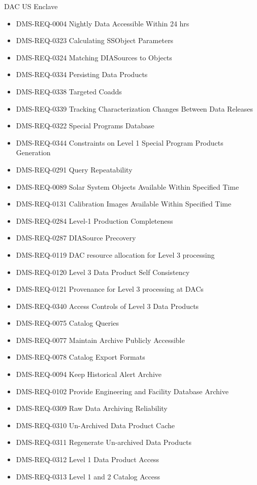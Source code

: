 DAC US Enclave \begin{itemize}
\item DMS-REQ-0004 Nightly Data Accessible Within 24 hrs
\item DMS-REQ-0323 Calculating SSObject Parameters
\item DMS-REQ-0324 Matching DIASources to Objects
\item DMS-REQ-0334 Persisting Data Products
\item DMS-REQ-0338 Targeted Coadds
\item DMS-REQ-0339 Tracking Characterization Changes Between Data Releases
\item DMS-REQ-0322 Special Programs Database
\item DMS-REQ-0344 Constraints on Level 1 Special Program Products Generation
\item DMS-REQ-0291 Query Repeatability
\item DMS-REQ-0089 Solar System Objects Available Within Specified Time
\item DMS-REQ-0131 Calibration Images Available Within Specified Time
\item DMS-REQ-0284 Level-1 Production Completeness
\item DMS-REQ-0287 DIASource Precovery
\item DMS-REQ-0119 DAC resource allocation for Level 3 processing
\item DMS-REQ-0120 Level 3 Data Product Self Consistency
\item DMS-REQ-0121 Provenance for Level 3 processing at DACs
\item DMS-REQ-0340 Access Controls of Level 3 Data Products
\item DMS-REQ-0075 Catalog Queries
\item DMS-REQ-0077 Maintain Archive Publicly Accessible
\item DMS-REQ-0078 Catalog Export Formats
\item DMS-REQ-0094 Keep Historical Alert Archive
\item DMS-REQ-0102 Provide Engineering and Facility Database Archive
\item DMS-REQ-0309 Raw Data Archiving Reliability
\item DMS-REQ-0310 Un-Archived Data Product Cache
\item DMS-REQ-0311 Regenerate Un-archived Data Products
\item DMS-REQ-0312 Level 1 Data Product Access
\item DMS-REQ-0313 Level 1 and 2 Catalog Access

\end{itemize}
